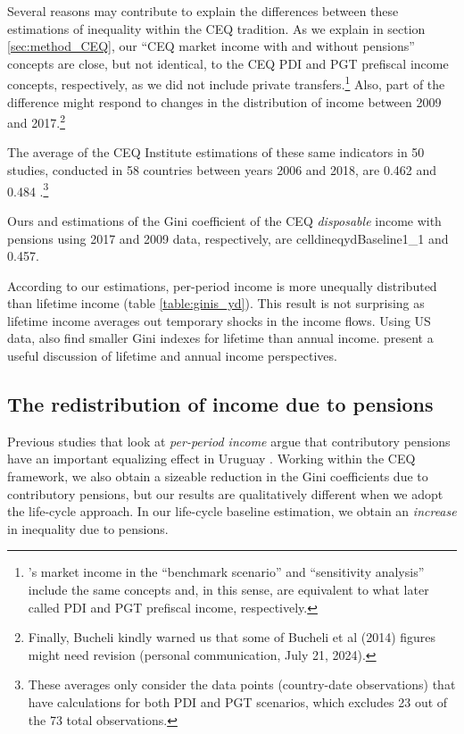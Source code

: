 \documentclass{article}
\newcommand{\celldineqydBaseline}[2]{%
  \csname celldineqydBaseline#1_#2\endcsname
}
\begin{document}
Several reasons may contribute to explain the differences between these estimations of inequality within the CEQ tradition. As we explain in section \ref{sec:method_CEQ}, our ``CEQ market income with and without pensions'' concepts are close, but not identical, to the CEQ PDI and PGT prefiscal income concepts, respectively, as we did not include private transfers.\footnote{\textcite{bucheli2014}'s market income in the ``benchmark scenario'' and ``sensitivity analysis'' include the same concepts and, in this sense, are equivalent to what \textcite{Lustig2022a} later called PDI and PGT prefiscal income, respectively.} Also, part of the difference might respond to changes in the distribution of income between 2009 and 2017.\footnote{Finally, Bucheli kindly warned us that some of Bucheli et al (2014) figures might need revision (personal communication, July 21, 2024).}

The average of the CEQ Institute estimations of these same indicators in 50 studies, conducted in 58 countries between years 2006 and 2018, are 0.462 and 0.484 \parencite{CEQ2024}.\footnote{These averages only consider the data points (country-date observations) that have calculations for both PDI and PGT scenarios, which excludes 23 out of the 73 total observations.}

Ours and \textcite{bucheli2014} estimations of the Gini coefficient of the CEQ \textit{disposable} income with pensions using 2017 and 2009 data, respectively, are \celldineqydBaseline{1}{1} and 0.457.	 

According to our estimations, per-period income is more unequally distributed than lifetime income (table \ref{table:ginis_yd}). This result is not surprising as lifetime income averages out temporary shocks in the income flows. Using US data, \textcite{Coronado2011} also find smaller Gini indexes for lifetime than annual income. \textcite{Fullerton1991} present a useful discussion of lifetime and annual income perspectives.


\subsection{The redistribution of income due to pensions}

Previous studies that look at \textit{per-period income} argue that contributory pensions have an important equalizing effect in Uruguay \parencite{llambi2010estudio, Amarante2011}. Working within the CEQ framework, we also obtain a sizeable reduction in the Gini coefficients due to contributory pensions, but our results are qualitatively different when we adopt the life-cycle approach. In our life-cycle baseline estimation, we obtain an \textit{increase} in inequality due to pensions. 
\end{document}
